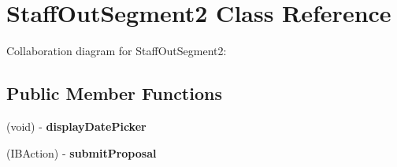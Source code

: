 \hypertarget{interface_staff_out_segment2}{
\section{\-Staff\-Out\-Segment2 \-Class \-Reference}
\label{interface_staff_out_segment2}
}


\-Collaboration diagram for \-Staff\-Out\-Segment2\-:
\subsection*{\-Public \-Member \-Functions}
\begin{DoxyCompactItemize}
\item 
\hypertarget{interface_staff_out_segment2_afdfbb88a51684f8b0f98618d66200315}{
(void) -\/ {\bfseries display\-Date\-Picker}}
\label{interface_staff_out_segment2_afdfbb88a51684f8b0f98618d66200315}

\item 
\hypertarget{interface_staff_out_segment2_abdaa4873ff33547a81a0b4407c79a8d1}{
(\-I\-B\-Action) -\/ {\bfseries submit\-Proposal}}
\label{interface_staff_out_segment2_abdaa4873ff33547a81a0b4407c79a8d1}

\end{DoxyCompactItemize}
